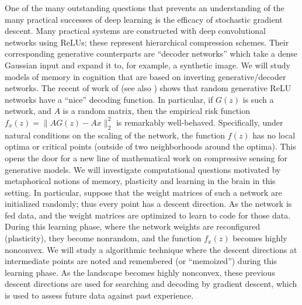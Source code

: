 One of the many outstanding questions that prevents an understanding
of the many practical successes of deep learning is the efficacy of
stochastic gradient descent. Many practical systems are constructed
with deep convolutional networks using ReLUs; these represent
hierarchical compression schemes. Their corresponding generative
counterparts are ``decoder networks'' which take a dense Gaussian
input and expand it to, for example, a synthetic image.  We will study
models of memory in cognition that are based on inverting
generative/decoder networks. The recent of work of \cite{HandV17} (see
also \cite{HandV18}) shows that random generative ReLU networks have a
``nice'' decoding function. In particular, if $G(z)$ is such a
network, and $A$ is a random matrix, then the empirical risk function
$ f_x(z) = \|AG(z) - Ax\|_2^2$ is remarkably
well-behaved. Specifically, under natural conditions on the scaling of
the network, the function $f(z)$ has no local optima or critical
points (outside of two neighborhoods around the optima). This opens
the door for a new line of mathematical work on compressive sensing
for generative models. We will investigate computational questions
motivated by metaphorical notions of memory, plasticity and learning
in the brain in this setting. In particular, suppose that the weight
matrices of such a network are initialized randomly; thus every point
has a descent direction. As the network is fed data, and the weight
matrices are optimized to learn to code for those data.  During this
learning phase, where the network weights are reconfigured
(plasticity), they become nonrandom, and the function $f_x(z)$ becomes
highly nonconvex. We will study a algorithmic technique where the
descent directions at intermediate points are noted and remembered (or
``memoized'') during this learning phase. As the landscape becomes
highly nonconvex, these previous descent directions are used for
searching and decoding by gradient descent, which is used to assess
future data against past experience.


